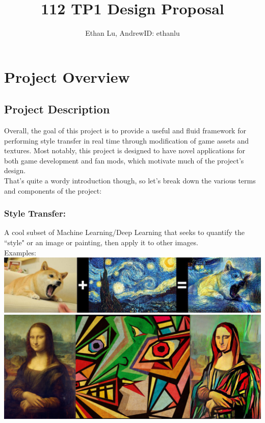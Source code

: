\documentclass[12pt]{article}
\begin{document}
\title{112 TP1 Design Proposal}
\author{Ethan Lu, AndrewID: ethanlu}
\maketitle
\section{Project Overview}

\subsection{Project Description}
    Overall, the goal of this project is to provide a useful and fluid framework for performing style transfer in real time through modification of game assets and textures. 
    Most notably, this project is designed to have novel applications for both game development and fan mods, which motivate much of the project's design. \\
    That's quite a wordy introduction though, so let's break down the various terms and components of the project:

    \subsubsection{Style Transfer:}
    A cool subset of Machine Learning/Deep Learning that seeks to quantify the ``style" or an image or painting, then apply it to other images. \\
    Examples: \\
    \includegraphics[width=\columnwidth]{ex1.jpg}\\
    \includegraphics[width=\columnwidth]{ex2.png}
\end{document}
